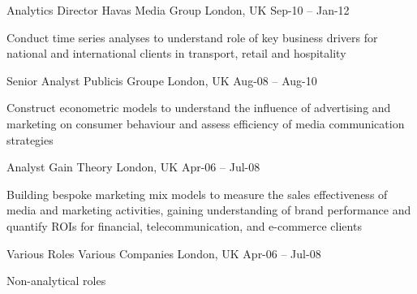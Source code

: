 \begin{cventries}
  \cventry
    {Analytics Director} %
    {Havas Media Group} %
    {London, UK} %
    {Sep-10 – Jan-12} %
    {
      \begin{cvitems} %
        \item {Conduct time series analyses to understand role of key business drivers for national and international clients in transport, retail and hospitality}
      \end{cvitems}
    }

  \cventry
    {Senior Analyst} %
    {Publicis Groupe} %
    {London, UK} %
    {Aug-08 – Aug-10} %
    {
      \begin{cvitems} %
        \item {Construct econometric models to understand the influence of advertising and marketing on consumer behaviour and assess efficiency of media communication strategies}
      \end{cvitems}
    }

  \cventry
    {Analyst} %
    {Gain Theory} %
    {London, UK} %
    {Apr-06 – Jul-08} %
    {
      \begin{cvitems} %
        \item {Building bespoke marketing mix models to measure the sales effectiveness of media and marketing activities, gaining understanding of brand performance and quantify ROIs for financial, telecommunication, and e-commerce clients}
      \end{cvitems}
    }
    
  \cventry
    {Various Roles} %
    {Various Companies} %
    {London, UK} %
    {Apr-06 – Jul-08} %
    {
      \begin{cvitems} %
        \item {Non-analytical roles}
      \end{cvitems}
    }

\end{cventries}
